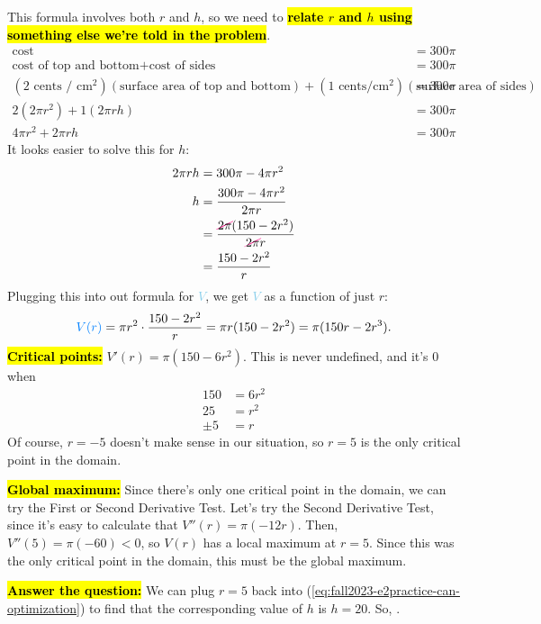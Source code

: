 \documentclass{article}
\newcommand{\colorcancel}[2]{\renewcommand{\CancelColor}{\color{#1}}\cancel{#2}\renewcommand{\CancelColor}{\color{black}}}
\newcommand{\highlight}[1]{\boldmath\hl{\textbf{#1}}\unboldmath}
\newcommand{\goal}[1]{\textbf{\textcolor{skyblue}{#1}}}
\theoremstyle{theorem}
\begin{document}
\begin{enumerate}
\begin{solution}
    This formula involves both $r$ and $h$, so we need to \highlight{relate $r$ and $h$ using something else we're told in the problem}.
    \begin{align*}
      \text{cost} &= 300 \pi \\
      \text{cost of top and bottom} + \text{cost of sides} &= 300 \pi \\
      (2 \text{ cents / cm$^2$})(\text{surface area of top and bottom}) + (1 \text{ cents/cm$^2$})(\text{surface area of sides}) &= 300 \pi \\
      2 (2 \pi r^2) + 1 (2 \pi r h) &= 300 \pi \\
      4 \pi r^2 + 2 \pi r h &= 300 \pi
    \end{align*}
    It looks easier to solve this for $h$:
    \begin{align}
      2 \pi r h &= 300 \pi - 4 \pi r^2 \nonumber \\
      h &= \frac{300 \pi - 4 \pi r^2}{2 \pi r} \nonumber \\
      &= \frac{\colorcancel{hotpink}{2 \pi} (150 - 2 r^2)}{\colorcancel{hotpink}{2 \pi} r} \nonumber \\
      &= \frac{150 - 2r^2}{r} \label{eq:fall2023-e2practice-can-optimization}
    \end{align}
    Plugging this into out formula for \goal{$V$}, we get \goal{$V$} as a function of just $r$:
    \[ \goal{$V(r)$} = \pi r^2 \cdot \frac{150 - 2r^2}{r} = \pi r (150 - 2r^2) = \pi(150 r - 2r^3).\]
    \highlight{Critical points:} $V'(r) = \pi (150 - 6r^2)$. This is never undefined, and it's 0 when
    \begin{align*}
      150 &= 6r^2 \\
      25 &= r^2 \\
      \pm 5 &= r
    \end{align*}
    Of course, $r = -5$ doesn't make sense in our situation, so $r = 5$ is the only critical point in the domain. 

    \highlight{Global maximum:} Since there's only one critical point in the domain, we can try the First or Second Derivative Test. Let's try the Second Derivative Test, since it's easy to calculate that $V''(r) = \pi (-12r)$. Then, $V''(5) = \pi (-60) < 0$, so $V(r)$ has a local maximum at $r = 5$. Since this was the only critical point in the domain, this must be the global maximum.

    \highlight{Answer the question:} We can plug $r = 5$ back into (\ref{eq:fall2023-e2practice-can-optimization}) to find that the corresponding value of $h$ is $h = 20$. So, .
  \end{solution}


\end{enumerate}
\end{document}
